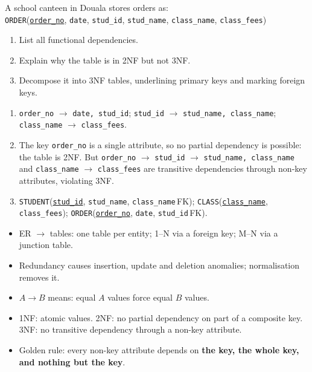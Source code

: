 \documentclass[11pt]{article}
\begin{document}
\begin{exercice}
A school canteen in Douala stores orders as:\\
\texttt{ORDER}(\underline{\texttt{order\_no}}, \texttt{date}, \texttt{stud\_id}, \texttt{stud\_name}, \texttt{class\_name}, \texttt{class\_fees})
\begin{enumerate}
\item List all functional dependencies.
\item Explain why the table is in 2NF but not 3NF.
\item Decompose it into 3NF tables, underlining primary keys and marking foreign keys.
\end{enumerate}
\end{exercice}

\begin{corrige}
\begin{enumerate}
\item \texttt{order\_no} $\rightarrow$ \texttt{date, stud\_id}; \texttt{stud\_id} $\rightarrow$ \texttt{stud\_name, class\_name}; \texttt{class\_name} $\rightarrow$ \texttt{class\_fees}.
\item The key \texttt{order\_no} is a single attribute, so no partial dependency is possible: the table is 2NF. But \texttt{order\_no} $\rightarrow$ \texttt{stud\_id} $\rightarrow$ \texttt{stud\_name, class\_name} and \texttt{class\_name} $\rightarrow$ \texttt{class\_fees} are transitive dependencies through non-key attributes, violating 3NF.
\item \texttt{STUDENT}(\underline{\texttt{stud\_id}}, \texttt{stud\_name}, \texttt{class\_name}\,FK); \texttt{CLASS}(\underline{\texttt{class\_name}}, \texttt{class\_fees}); \texttt{ORDER}(\underline{\texttt{order\_no}}, \texttt{date}, \texttt{stud\_id}\,FK).
\end{enumerate}
\end{corrige}

\begin{aretenir}
\begin{itemize}
\item ER $\rightarrow$ tables: one table per entity; 1--N via a foreign key; M--N via a junction table.
\item Redundancy causes insertion, update and deletion anomalies; normalisation removes it.
\item $A \rightarrow B$ means: equal $A$ values force equal $B$ values.
\item 1NF: atomic values. 2NF: no partial dependency on part of a composite key. 3NF: no transitive dependency through a non-key attribute.
\item Golden rule: every non-key attribute depends on \textbf{the key, the whole key, and nothing but the key}.
\end{itemize}
\end{aretenir}
\end{document}
